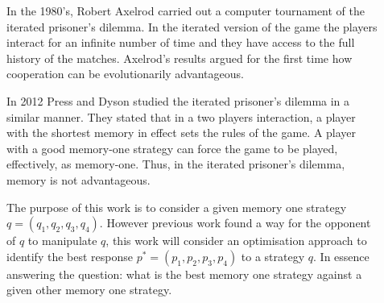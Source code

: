 \documentclass[usenames,dvipsnames,t]{beamer}
\begin{document}
\begin{columns}
    \begin{column}{.025\linewidth}
    \end{column}
    \begin{column}{.5\linewidth}
        \vspace{0.9cm}
    
   \small{In the 1980's, Robert Axelrod carried out a computer tournament of the
          iterated prisoner's dilemma. In the iterated version of the game the players
          interact for an infinite number of time and they have access to the full history
          of the matches. Axelrod's results argued for the first time how
          cooperation can be evolutionarily advantageous.}
    
    \begin{center}
        
    \end{center}

    \small{In 2012 Press and Dyson studied the iterated prisoner's dilemma in a
           similar manner. They stated that in a two players interaction, a player
           with the shortest memory in effect sets the rules of the game. A player
           with a good memory-one strategy can force the game to be played,
           effectively, as memory-one. Thus, in the iterated prisoner's dilemma,
           memory is not advantageous.}
    \vspace{0.5cm}
    
    \small{The purpose of this work is to consider a given memory one strategy 
    \(q=(q_1, q_2, q_3, q_4)\). However previous work found a way for
    the opponent of \(q\) to manipulate \(q\), this work will consider an optimisation
    approach to identify the best response \(p^*=(p_1, p_2, p_3, p_4)\) to a strategy
    \(q\). In essence answering the question: what is the best memory one strategy
    against a given other memory one strategy.
    }
    \end{column}

    \begin{column}{.5\linewidth}
    \end{column}
\end{columns}
\end{document}
